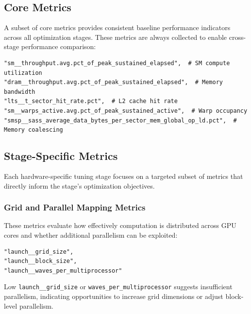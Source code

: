 \subsection{Core Metrics}

A subset of core metrics provides consistent baseline performance indicators across all optimization stages. These metrics are always collected to enable cross-stage performance comparison:

\begin{mdframed}[linewidth=1pt, linecolor=black, backgroundcolor=gray!5]
\begin{lstlisting}
"sm__throughput.avg.pct_of_peak_sustained_elapsed",  # SM compute utilization
"dram__throughput.avg.pct_of_peak_sustained_elapsed",  # Memory bandwidth
"lts__t_sector_hit_rate.pct",  # L2 cache hit rate
"sm__warps_active.avg.pct_of_peak_sustained_active",  # Warp occupancy
"smsp__sass_average_data_bytes_per_sector_mem_global_op_ld.pct",  # Memory coalescing
\end{lstlisting}
\end{mdframed}

\subsection{Stage-Specific Metrics}

Each hardware-specific tuning stage focuses on a targeted subset of metrics that directly inform the stage's optimization objectives.

\subsubsection{Grid and Parallel Mapping Metrics}

These metrics evaluate how effectively computation is distributed across GPU cores and whether additional parallelism can be exploited:

\begin{mdframed}[linewidth=1pt, linecolor=black, backgroundcolor=gray!5]
\begin{lstlisting}
"launch__grid_size",
"launch__block_size",
"launch__waves_per_multiprocessor"
\end{lstlisting}
\end{mdframed}

Low \texttt{launch\_\_grid\_size} or \texttt{waves\_per\_multiprocessor} suggests insufficient parallelism, indicating opportunities to increase grid dimensions or adjust block-level parallelism.

